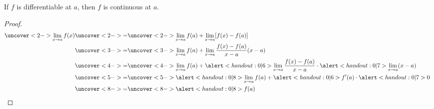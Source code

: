 \begin{frame}
\begin{theorem}
If \alert<handout:0| 6>{$f$ is differentiable at $a$}, then $f$ is continuous at $a$.
\end{theorem}
\begin{proof}
\begin{align*}
\uncover<2->{\lim_{x\rightarrow a}f(x)}%
 &\uncover<2->{ = }  %
\uncover<2->{\lim_{x\rightarrow a}f(a) + \lim_{x\rightarrow a}[f(x) - f(a)]}\\%
 &\uncover<3->{ = }  %
\uncover<3->{\lim_{x\rightarrow a}f(a) + \lim_{x\rightarrow a}\frac{f(x) - f(a)}{x-a} (x-a)}\\%
 &\uncover<4->{ = }  %
\uncover<4->{\lim_{x\rightarrow a}f(a) + \alert<handout:0| 6>{\lim_{x\rightarrow a}\frac{f(x) - f(a)}{x-a}}\cdot \alert<handout:0| 7>{\lim_{x\rightarrow a}(x-a)}}\\%
 &\uncover<5->{ = }  %
\uncover<5->{\alert<handout:0| 8>{\lim_{x\rightarrow a}f(a)} + \alert<handout:0| 6>{f'(a)} \cdot \alert<handout:0| 7>{0}}\\%
 &\uncover<8->{ = }  %
\uncover<8->{\alert<handout:0| 8>{f(a)}}%
\end{align*}
%
\end{proof}
\end{frame}
